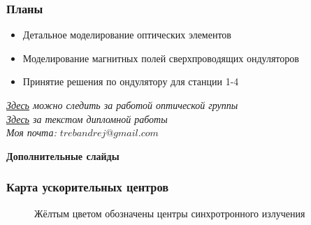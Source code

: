 \documentclass[14pt, hyperref = {colorlinks},xcolor=table ]{beamer}
\begin{document}
\small
\begin{frame}
\frametitle{Планы}\label{t1}
\begin{center}
	\begin{itemize}
		\item Детальное моделирование оптических элементов
		\item Моделирование магнитных полей сверхпроводящих ондуляторов	
		\item Принятие решения по ондулятору для станции 1-4
	\end{itemize}
\end{center}
{\textit{\href{https://github.com/TrebAndrew/thesis_andrei.git}{Здесь} можно следить за работой оптической группы}}\\
{\textit{\href{https://github.com/TrebAndrew/diploma.git}{Здесь} за текстом дипломной работы}}\\
{\textit{Моя почта: $trebandrej@gmail.com$}}\\
\end{frame}

\maketitle


\begin{frame}
\begin{center}
	\textbf{Дополнительные слайды}
\end{center}
\end{frame}

\small
\begin{frame}\label{r3}
\frametitle{Карта ускорительных центров}
\vspace{-20pt}
\begin{figure}[h]
	\raggedright\tiny{Жёлтым цветом обозначены центры синхротронного излучения}
\end{figure}
\end{frame}
\end{document}
